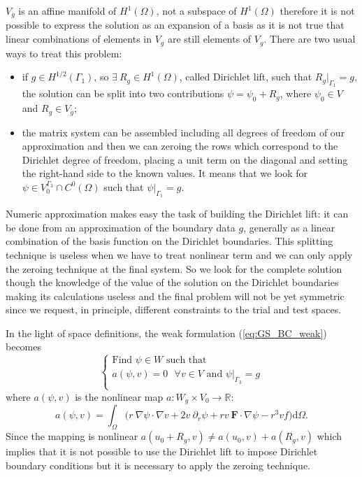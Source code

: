 $V_g$ is an affine manifold of $H^1(\Omega)$, not a subspace of $H^1(\Omega)$ therefore it is not possible to express the solution as an expansion of a basis as it is not true that linear combinations of elements in $V_g$ are still elements of $V_g$. There are two usual ways to treat this problem:
\begin{itemize}
  \item if $g\in H^{1/2}(\Gamma_1)$, so $\exists\: R_g\in H^1(\Omega)$, called Dirichlet lift, such that $R_g|_{\Gamma_1}=g$, the solution can be split into two contributions $\psi=\psi_0+R_g$, where $\psi_0\in V$ and $R_g\in V_g$;
  \item the matrix system can be assembled including all degrees of freedom of our approximation and then we can zeroing the rows which correspond to the Dirichlet degree of freedom,
  placing a unit term on the diagonal and setting the right-hand side to the known values. It means that we look for $\psi\in V_0^{\Gamma_3}\cap C^0(\Omega)$ such that $\psi|_{\Gamma_1}=g$.
\end{itemize}
Numeric approximation makes easy the task of building the Dirichlet lift: it can be done from an approximation of the boundary data $g$, generally as a linear combination of the basis function on the Dirichlet boundaries. This splitting technique is useless when we have to treat nonlinear term and we can only apply the zeroing technique at the final system. So we look for the complete solution though the knowledge of the value of the solution on the Dirichlet boundaries making its calculations useless and the final problem will not be yet symmetric since we request, in principle, different constraints to the trial and test spaces.

In the light of space definitions, the weak formulation (\ref{eq:GS_BC_weak}) becomes
\begin{equation}\label{eq:prob_var}
  \left\{\begin{array}{ll}\textrm{Find $\psi\in W$ such that}\\
  \textrm{$a(\psi,v)=0$ $\forall v\in V$ and $\psi|_{\Gamma_3}=g$}\\
\end{array}\right.
\end{equation}
where $a(\psi,v)$ is the nonlinear map $a:W_g\times V_0\rightarrow\mathbb{R}$:
\begin{equation}\label{eq:a_operator}
  a(\psi,v)=\int_\Omega \big(r\:\nabla\psi \cdot\nabla v+2v\:\partial_r \psi+rv\:\mathbf{F}\cdot\nabla\psi -r^3vf\big)\mathrm{d}\Omega.
\end{equation}
Since the mapping is nonlinear $a(u_0+R_g,v)\neq a(u_0,v)+a(R_g,v)$ which implies that it is not possible to use the Dirichlet lift to impose Dirichlet boundary conditions but it is necessary to apply the zeroing technique.


